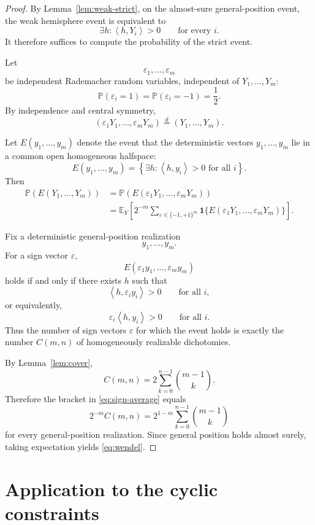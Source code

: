 \documentclass[11pt]{article}
\newcommand{\ip}[2]{\left\langle #1,#2\right\rangle}
\newcommand{\E}{\mathbb{E}}
\newcommand{\Pp}{\mathbb{P}}
\newcommand{\1}{\mathbf{1}}
\begin{document}
\begin{proof}
By Lemma~\ref{lem:weak-strict}, on the almost-sure general-position event,
the weak hemisphere event is equivalent to
\[
\exists h:
\ip{h}{Y_i}>0
\qquad
\text{for every }i.
\]
It therefore suffices to compute the probability of the strict event.

Let
\[
\varepsilon_1,\dots,\varepsilon_m
\]
be independent Rademacher random variables, independent of
\(Y_1,\dots,Y_m\):
\[
\Pp(\varepsilon_i=1)
=
\Pp(\varepsilon_i=-1)
=
\frac12.
\]
By independence and central symmetry,
\[
(\varepsilon_1Y_1,\dots,\varepsilon_mY_m)
\overset{d}{=}
(Y_1,\dots,Y_m).
\]

Let \(E(y_1,\dots,y_m)\) denote the event that the deterministic vectors
\(y_1,\dots,y_m\) lie in a common open homogeneous halfspace:
\[
E(y_1,\dots,y_m)
=
\left\{
\exists h:
\ip{h}{y_i}>0
\text{ for all }i
\right\}.
\]
Then
\begin{align}
\Pp(E(Y_1,\dots,Y_m))
&=
\Pp(E(\varepsilon_1Y_1,\dots,\varepsilon_mY_m))
\nonumber\\
&=
\E_Y
\left[
2^{-m}
\sum_{\varepsilon\in\{-1,+1\}^m}
\1\{
E(\varepsilon_1Y_1,\dots,\varepsilon_mY_m)
\}
\right].
\label{eq:sign-average}
\end{align}

Fix a deterministic general-position realization
\[
y_1,\dots,y_m.
\]
For a sign vector \(\varepsilon\),
\[
E(\varepsilon_1y_1,\dots,\varepsilon_my_m)
\]
holds if and only if there exists \(h\) such that
\[
\ip{h}{\varepsilon_i y_i}>0
\qquad
\text{for all }i,
\]
or equivalently,
\[
\varepsilon_i\ip{h}{y_i}>0
\qquad
\text{for all }i.
\]
Thus the number of sign vectors \(\varepsilon\) for which the event holds
is exactly the number \(C(m,n)\) of homogeneously realizable dichotomies.

By Lemma~\ref{lem:cover},
\[
C(m,n)
=
2\sum_{k=0}^{n-1}\binom{m-1}{k}.
\]
Therefore the bracket in \eqref{eq:sign-average} equals
\[
2^{-m}C(m,n)
=
2^{1-m}
\sum_{k=0}^{n-1}\binom{m-1}{k}
\]
for every general-position realization. Since general position holds
almost surely, taking expectation yields \eqref{eq:wendel}.
\end{proof}

\section{Application to the cyclic constraints}
\end{document}
